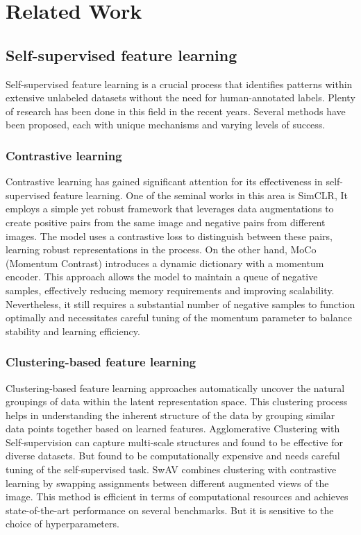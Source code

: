 \chapter{Related Work}\label{chap:relatedwork}
\section{Self-supervised feature learning}
Self-supervised feature learning is a crucial process that identifies patterns within extensive unlabeled datasets without the need for human-annotated labels. Plenty of research has been done in this field in the recent years. Several methods have been proposed, each with unique mechanisms and varying levels of success.

\subsection{Contrastive learning}
Contrastive learning has gained significant attention for its effectiveness in self-supervised feature learning. One of the seminal works in this area is SimCLR\cite{chen2020simple}, It employs a simple yet robust framework that leverages data augmentations to create positive pairs from the same image and negative pairs from different images. The model uses a contrastive loss to distinguish between these pairs, learning robust representations in the process. On the other hand, MoCo (Momentum Contrast)\cite{he2020momentum} introduces a dynamic dictionary with a momentum encoder. This approach allows the model to maintain a queue of negative samples, effectively reducing memory requirements and improving scalability. Nevertheless, it still requires a substantial number of negative samples to function optimally and necessitates careful tuning of the momentum parameter to balance stability and learning efficiency.

\subsection{Clustering-based feature learning}
Clustering-based feature learning approaches automatically uncover the natural groupings of data within the latent representation space. This clustering process helps in understanding the inherent structure of the data by grouping similar data points together based on learned features. Agglomerative Clustering with Self-supervision\cite{asano2020selflabelling} can capture multi-scale structures and found to be effective for diverse datasets. But found to be computationally expensive and needs careful tuning of the self-supervised task. SwAV\cite{caron2021unsupervised} combines clustering with contrastive learning by swapping assignments between different augmented views of the image. This method is efficient in terms of computational resources and achieves state-of-the-art performance on several benchmarks. But it is sensitive to the choice of hyperparameters.

